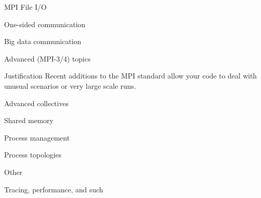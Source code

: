 \documentclass[10pt]{beamer}
\begin{document}
{} {MPI File I/O}
\label{sec:io}


{} {One-sided communication}
\label{sec:1side}
 


{} {Big data communication}
\label{sec:bigdata}


{} {Advanced (MPI-3/4) topics}

\begin{frame}{Justification}
  Recent additions to the MPI standard allow your 
  code to deal with unusual scenarios or very large scale runs.
\end{frame}

{} {Advanced collectives}
\label{sec:coll2}


{} {Shared memory}
\label{sec:shared}


{} {Process management}
\label{sec:process}


{} {Process topologies}
\label{sec:topo}


{} {Other}

{} {Tracing, performance, and such}
\label{sec:trace}

\end{document}
